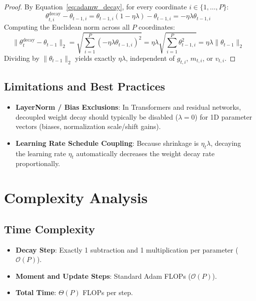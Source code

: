 \documentclass[11pt,a4paper]{article}
\theoremstyle{definition}
\begin{document}
\begin{proof}
By Equation~\eqref{eq:adamw_decay}, for every coordinate $i \in \{1, \dots, P\}$:
\begin{equation}
\theta_{t, i}^{\text{decay}} - \theta_{t-1, i} = \theta_{t-1, i}(1 - \eta \lambda) - \theta_{t-1, i} = -\eta \lambda \theta_{t-1, i}
\end{equation}
Computing the Euclidean norm across all $P$ coordinates:
\begin{equation}
\|\theta_t^{\text{decay}} - \theta_{t-1}\|_2 = \sqrt{\sum_{i=1}^P (-\eta \lambda \theta_{t-1, i})^2} = \eta \lambda \sqrt{\sum_{i=1}^P \theta_{t-1, i}^2} = \eta \lambda \|\theta_{t-1}\|_2
\end{equation}
Dividing by $\|\theta_{t-1}\|_2$ yields exactly $\eta \lambda$, independent of $g_{t, i}$, $m_{t, i}$, or $v_{t, i}$.
\end{proof}

\subsection{Limitations and Best Practices}
\begin{itemize}
    \item \textbf{LayerNorm / Bias Exclusions}: In Transformers and residual networks, decoupled weight decay should typically be disabled ($\lambda = 0$) for 1D parameter vectors (biases, normalization scale/shift gains).
    \item \textbf{Learning Rate Schedule Coupling}: Because shrinkage is $\eta_t \lambda$, decaying the learning rate $\eta_t$ automatically decreases the weight decay rate proportionally.
\end{itemize}

\section{Complexity Analysis}

\subsection{Time Complexity}
\begin{itemize}
    \item \textbf{Decay Step}: Exactly 1 subtraction and 1 multiplication per parameter ($\mathcal{O}(P)$).
    \item \textbf{Moment and Update Steps}: Standard Adam FLOPs ($\mathcal{O}(P)$).
    \item \textbf{Total Time}: $\Theta(P)$ FLOPs per step.
\end{itemize}
\end{document}
